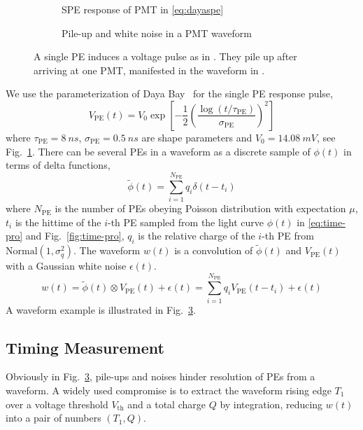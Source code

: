 \begin{figure}[H]
  \begin{subfigure}{.49\textwidth}
    \centering
    \resizebox{\textwidth}{!}{}
    \caption{\label{fig:spe} SPE response of PMT in \eqref{eq:dayaspe}}
  \end{subfigure}
  \begin{subfigure}{.49\textwidth}
    \centering
    \resizebox{\textwidth}{!}{}
    \caption{\label{fig:pile} Pile-up and white noise in a PMT waveform}
  \end{subfigure}
  \caption{A single PE induces a voltage pulse as in .  They pile up after arriving at one PMT, manifested in the waveform in .}
\end{figure}

We use the parameterization of Daya Bay~\cite{jetter_pmt_2012} for the single PE response pulse,
\begin{equation}
  V_\mathrm{PE}(t) = V_{0}\exp\left[-\frac{1}{2}\left(\frac{\log(t/\tau_\mathrm{PE})}{\sigma_\mathrm{PE}}\right)^{2}\right]
  \label{eq:dayaspe}
\end{equation}
where $\tau_\mathrm{PE}=\SI{8}{ns}$, $\sigma_\mathrm{PE}=\SI{0.5}{ns}$ are shape parameters and $V_{0}=\SI{14.08}{mV}$, see Fig.~\ref{fig:spe}.  There can be several PEs in a waveform as a discrete sample of $\phi(t)$ in terms of delta functions,
\begin{equation}
  \label{eq:lc-sample}
  \tilde{\phi}(t) = \sum_{i=1}^{N_{\mathrm{PE}}} q_i \delta(t-t_i)
\end{equation}
where $N_\mathrm{PE}$ is the number of PEs obeying Poisson distribution with expectation $\mu$, $t_i$ is the hittime of the $i$-th PE sampled from the light curve $\phi(t)$ in \eqref{eq:time-pro} and Fig.~\ref{fig:time-pro}, $q_i$ is the relative charge of the $i$-th PE from $\mathrm{Normal}(1,\sigma_{q}^2)$.  The waveform $w(t)$ is a convolution of $\tilde{\phi}(t)$ and $V_\mathrm{PE}(t)$ with a Gaussian white noise $\epsilon(t)$.
\begin{equation}
  \label{eq:1}
  w(t) = \tilde{\phi}(t) \otimes V_\mathrm{PE}(t) + \epsilon(t) =  \sum_{i=1}^{N_\mathrm{PE}} q_i V_\mathrm{PE}(t-t_i) + \epsilon(t)
\end{equation}
A waveform example is illustrated in Fig.~\ref{fig:pile}.

\subsection{Timing Measurement}
Obviously in Fig.~\ref{fig:pile}, pile-ups and noises hinder resolution of PEs from a waveform.  A widely used compromise is to extract the waveform rising edge $T_1$ over a voltage threshold $V_\mathrm{th}$ and a total charge $Q$ by integration, reducing $w(t)$ into a pair of numbers $(T_1, Q)$.

